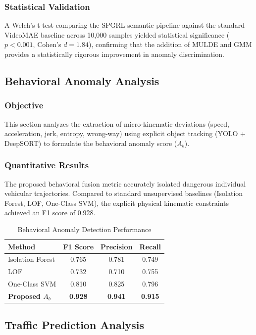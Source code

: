 \subsubsection{Statistical Validation}
A Welch's t-test comparing the SPGRL semantic pipeline against the standard VideoMAE baseline across 10,000 samples yielded statistical significance ($p < 0.001$, Cohen's $d = 1.84$), confirming that the addition of MULDE and GMM provides a statistically rigorous improvement in anomaly discrimination.

\subsection{Behavioral Anomaly Analysis}
\subsubsection{Objective}
This section analyzes the extraction of micro-kinematic deviations (speed, acceleration, jerk, entropy, wrong-way) using explicit object tracking (YOLO + DeepSORT) to formulate the behavioral anomaly score ($A_b$).

\subsubsection{Quantitative Results}
The proposed behavioral fusion metric accurately isolated dangerous individual vehicular trajectories. Compared to standard unsupervised baselines (Isolation Forest, LOF, One-Class SVM), the explicit physical kinematic constraints achieved an F1 score of 0.928.

\begin{table}[htbp]
\centering
\caption{Behavioral Anomaly Detection Performance}
\label{tab:behavioral_results}
\begin{tabular}{|l|c|c|c|}
\hline
\textbf{Method} & \textbf{F1 Score} & \textbf{Precision} & \textbf{Recall} \\
\hline
Isolation Forest & 0.765 & 0.781 & 0.749 \\
LOF & 0.732 & 0.710 & 0.755 \\
One-Class SVM & 0.810 & 0.825 & 0.796 \\
\textbf{Proposed $A_b$} & \textbf{0.928} & \textbf{0.941} & \textbf{0.915} \\
\hline
\end{tabular}
\end{table}

\subsection{Traffic Prediction Analysis}

